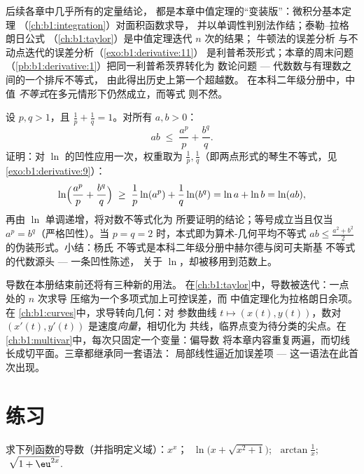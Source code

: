 \begin{remark}[中值定理接下来在哪里起作用]
后续各章中几乎所有的定量结论，
都是本章中值定理的“变装版”：微积分基本定理
（\cref{ch:b1:integration}）对面积函数求导，
并以单调性判别法作结；泰勒–拉格朗日公式
（\cref{ch:b1:taylor}）是中值定理迭代 $n$ 次的结果；
牛顿法的误差分析
与不动点迭代的误差分析（\cref{exo:b1:derivative:11}）
是利普希茨形式；本章的周末问题
（\cref{pb:b1:derivative:1}）把同一利普希茨界转化为
数论问题 --- 代数数与有理数之间的一个排斥不等式，
由此得出历史上第一个超越数。
在本科二年级分册中，中值
\emph{不等式}在多元情形下仍然成立，而等式
则不然。
\end{remark}

\begin{example}[由凹性得到的杨氏不等式]\label{ex:b1:derivative:young}
设 $p, q > 1$，且 $\frac1p + \frac1q = 1$。对所有 $a, b > 0$：
\[
ab \;\leq\; \frac{a^p}{p} + \frac{b^q}{q} .
\]
证明：对 $\ln$ 的凹性应用一次，权重取为
$\frac1p, \frac1q$（即两点形式的琴生不等式，见
\cref{exo:b1:derivative:9}）：
\[
\ln\Bigl(\frac{a^p}{p} + \frac{b^q}{q}\Bigr)
\;\geq\; \frac1p \ln(a^p) + \frac1q \ln(b^q)
= \ln a + \ln b = \ln(ab),
\]
再由 $\ln$ 单调递增，将对数不等式化为
所要证明的结论；等号成立当且仅当 $a^p = b^q$（严格凹性）。当
$p = q = 2$ 时，本式即为算术-几何平均不等式 $ab \leq
\frac{a^2 + b^2}{2}$ 的伪装形式。小结：杨氏
不等式是本科二年级分册中赫尔德与闵可夫斯基
不等式的代数源头 --- 一条凹性陈述，
关于 $\ln$，却被移用到范数上。
\end{example}

\begin{remark}[本册内的展望]
导数在本册结束前还将有三种新的用法。
在\cref{ch:b1:taylor}中，导数被迭代：一点处的 $n$ 次求导
压缩为一个多项式加上可控误差，而
中值定理化为拉格朗日余项。在
\cref{ch:b1:curves}中，求导转向几何：对
参数曲线 $t \mapsto (x(t), y(t))$，数对 $(x'(t),
y'(t))$ 是速度\emph{向量}，相切化为
共线，临界点变为待分类的尖点。在
\cref{ch:b1:multivar}中，每次只固定一个变量：偏导数
将本章内容重复两遍，而切线
长成切平面。三章都继承同一套语法：
局部线性逼近加误差项 ---
这一语法在此首次出现。
\end{remark}

\section{练习}

\begin{exercise}[$\star$]\label{exo:b1:derivative:1}
求下列函数的导数（并指明定义域）：$x^x$；
$\;\ln\bigl(x + \sqrt{x^2+1}\bigr)$; $\;\arctan\frac{1}{x}$;
$\;\sqrt{1 + \eu^{2x}}$.
\end{exercise}

